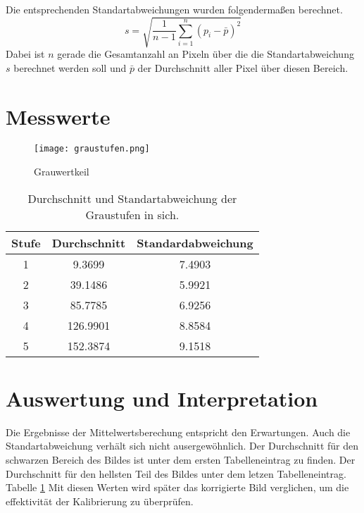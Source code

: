 Die entsprechenden Standartabweichungen wurden folgendermaßen berechnet.
\begin{equation}
s = \sqrt{\frac{1}{n-1}\sum_{i=1}^{n} (p_i- \bar{p})^2}
\end{equation}
Dabei ist $n$ gerade die Gesamtanzahl an Pixeln über die die Standartabweichung $s$ berechnet werden soll und $\bar{p}$ der Durchschnitt aller Pixel über diesen Bereich.

\section{Messwerte}
\label{chap:VERSUCH_1_MESSWERTE}
\begin{figure}[H]
\centering
\texttt{[image: graustufen.png]}
\caption{Grauwertkeil}
\label{img:Grauwertkeil}
\end{figure}
\begin{table}
\centering
\begin{tabular}{c|cc}
Stufe & Durchschnitt & Standardabweichung \\
\hline
1 & 9.3699 & 7.4903 \\
2 & 39.1486 & 5.9921 \\
3 & 85.7785 & 6.9256 \\
4 & 126.9901 & 8.8584 \\
5 & 152.3874 & 9.1518 \\
\end{tabular}
\caption{Durchschnitt und Standartabweichung der Graustufen in sich.}
\label{tab:GrauStufen_Mean}
\end{table}
\newpage
\section{Auswertung und Interpretation}
\label{chap:VERSUCH_1_AUSWERTUNG}
Die Ergebnisse der Mittelwertsberechung entspricht den Erwartungen. Auch die Standartabweichung verhält sich nicht ausergewöhnlich.
Der Durchschnitt für den schwarzen Bereich des Bildes ist unter dem ersten Tabelleneintrag zu finden. Der Durchschnitt für den hellsten Teil des Bildes unter dem letzen Tabelleneintrag. Tabelle \ref{tab:GrauStufen_Mean} Mit diesen Werten wird später das korrigierte Bild verglichen, um die effektivität der Kalibrierung zu überprüfen.
